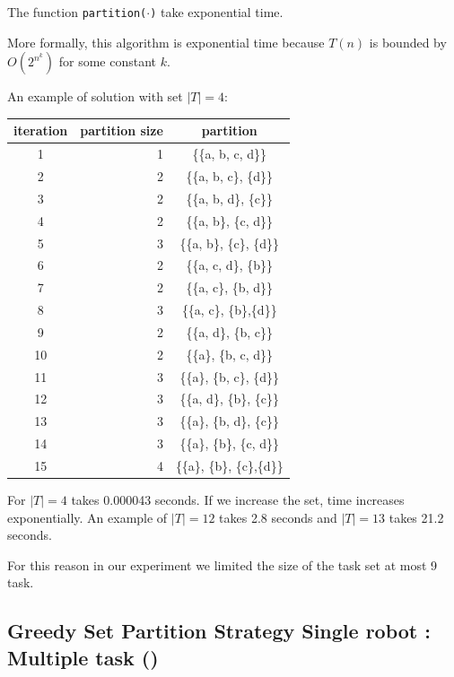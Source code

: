 The function \texttt{partition($\cdot$)} take exponential time. 

More formally, this algorithm is exponential time because $T(n)$ is bounded by $O(2^{n^{k}})$ 
for some constant $k$.

\newpage
An example of solution with set $|T| = 4$:
\begin{center}
  \begin{tabular}{|c|r|c|} \hline
  \textbf{iteration} & \textbf{partition size} & \textbf{partition} \\ \hline
  1    & 1    & \{\{a, b, c, d\}\}   \\
  2    & 2    & \{\{a, b, c\}, \{d\}\}   \\
  3    & 2    & \{\{a, b, d\}, \{c\}\}   \\
  4    & 2    & \{\{a, b\}, \{c, d\}\}   \\
  5    & 3    & \{\{a, b\}, \{c\}, \{d\}\}   \\
  6    & 2    & \{\{a, c, d\}, \{b\}\}   \\
  7    & 2    & \{\{a, c\}, \{b, d\}\}   \\
  8    & 3    & \{\{a, c\}, \{b\},\{d\}\}   \\
  9    & 2    & \{\{a, d\}, \{b, c\}\}   \\
  10   & 2    & \{\{a\}, \{b, c, d\}\}   \\
  11   & 3    & \{\{a\}, \{b, c\}, \{d\}\}   \\
  12   & 3    & \{\{a, d\}, \{b\}, \{c\}\}   \\
  13   & 3    & \{\{a\}, \{b, d\}, \{c\}\}   \\
  14   & 3    & \{\{a\}, \{b\}, \{c, d\}\}   \\
  15   & 4    & \{\{a\}, \{b\}, \{c\},\{d\}\}   \\ \hline       
  \end{tabular}
\end{center}

For $|T| = 4$ takes 0.000043 seconds. If we increase the set, time increases exponentially.
An example of $|T| = 12$ takes 2.8 seconds and $|T| = 13$ takes 21.2 seconds.

For this reason in our experiment we limited the size of the task set at most 9 task.

\subsection{Greedy Set Partition Strategy Single robot : Multiple task (\gsp)}


